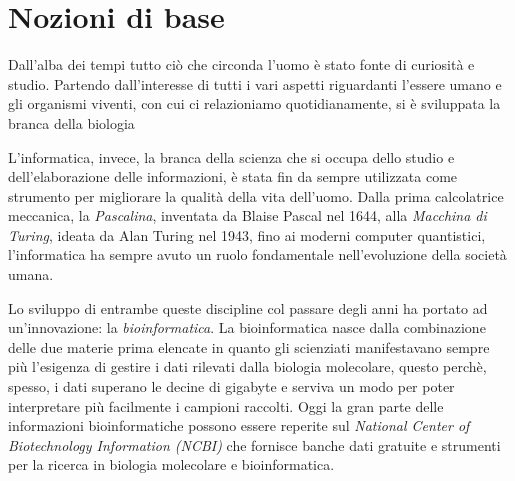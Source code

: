 \chapter{Nozioni di base}\label{chapter:cap_one}
Dall'alba dei tempi tutto ciò che circonda l'uomo è stato fonte di curiosità e studio.
Partendo dall'interesse di tutti i vari aspetti riguardanti l’essere umano e gli organismi viventi,
con cui ci relazioniamo quotidianamente, si è sviluppata la branca della biologia

L'informatica, invece, la branca della scienza che si occupa dello studio e dell'elaborazione delle informazioni,
è stata fin da sempre utilizzata come strumento per migliorare la qualità della vita dell'uomo\cite{treccaniInformatica}.
Dalla prima calcolatrice meccanica, la \textit{Pascalina}, inventata da Blaise Pascal nel 1644\cite{pascal1995pensieri}, 
alla \textit{Macchina di Turing}, ideata da Alan Turing nel 1943\cite{singh1999codici}, 
fino ai moderni computer quantistici, l'informatica ha sempre avuto un ruolo fondamentale nell'evoluzione della società umana.

Lo sviluppo di entrambe queste discipline col passare degli anni ha portato ad un'innovazione: la \textit{bioinformatica}.
La bioinformatica nasce dalla combinazione delle due materie prima elencate in quanto gli scienziati manifestavano
sempre più l'esigenza di gestire i dati rilevati dalla biologia
molecolare, questo perchè, spesso, i dati superano le decine di gigabyte e serviva un modo per poter interpretare più facilmente i campioni raccolti.
Oggi la gran parte delle informazioni bioinformatiche possono essere reperite sul \textit{National
Center of Biotechnology Information (NCBI)} che fornisce banche dati gratuite e strumenti per la ricerca in biologia molecolare e bioinformatica.\cite{ncbi}
